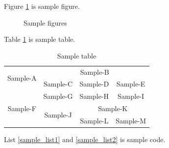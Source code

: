 Figure \ref{sample_figure} is sample figure.
\begin{figure}
    \centering
    \caption{Sample figures}
    \label{sample_figure}
\end{figure}

Table \ref{sample_table} is sample table.
\begin{table}
    \centering
    \caption{Sample table}
    \begin{tabular}{|c|c|c|c|}
        \hline
        \multirow{2}{*}{Sample-A} & \multicolumn{3}{|c|}{Sample-B} \\ \cline{2-4}
        & Sample-C & Sample-D & Sample-E \\ \hline
        \multirow{3}{*}{Sample-F} & Sample-G & Sample-H & Sample-I \\ \cline{2-4}
        & \multirow{2}{*}{Sample-J} & \multicolumn{2}{|c|}{Sample-K} \\ \cline{3-4}
        & & Sample-L & Sample-M \\ \hline
    \end{tabular}
    \label{sample_table}
\end{table}

List \ref{sample_list1} and \ref{sample_list2} is sample code.

\begin{code}
    \caption{Sample code 1}
    
    \label{sample_list1}
\end{code}

\begin{code*}
    \caption{Sample code 2}
    
    \label{sample_list2}
\end{code*}

